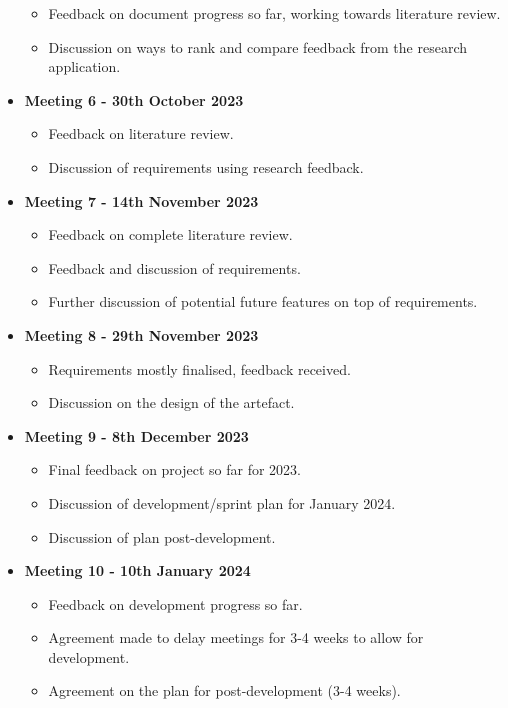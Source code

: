 \begin{itemize}
    \begin{itemize}
        \item Feedback on document progress so far, working towards literature review.
        \item Discussion on ways to rank and compare feedback from the research application.
    \end{itemize}
    \item \textbf{Meeting 6 - 30th October 2023}
    \begin{itemize}
        \item Feedback on literature review.
        \item Discussion of requirements using research feedback.
    \end{itemize}
    \item \textbf{Meeting 7 - 14th November 2023}
    \begin{itemize}
        \item Feedback on complete literature review.
        \item Feedback and discussion of requirements.
        \item Further discussion of potential future features on top of requirements.
    \end{itemize}
    \item \textbf{Meeting 8 - 29th November 2023}
    \begin{itemize}
        \item Requirements mostly finalised, feedback received.
        \item Discussion on the design of the artefact.
    \end{itemize}
    \item \textbf{Meeting 9 - 8th December 2023}
    \begin{itemize}
        \item Final feedback on project so far for 2023.
        \item Discussion of development/sprint plan for January 2024.
        \item Discussion of plan post-development.
    \end{itemize}
    \item \textbf{Meeting 10 - 10th January 2024}
    \begin{itemize}
        \item Feedback on development progress so far.
        \item Agreement made to delay meetings for 3-4 weeks to allow for development.
        \item Agreement on the plan for post-development (3-4 weeks).

\end{itemize}
\end{itemize}
